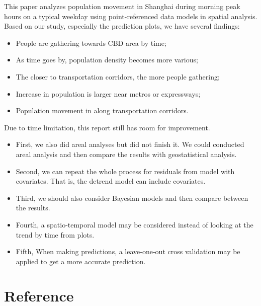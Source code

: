 \documentclass[hidelinks,12pt]{article}
\begin{document}
	This paper analyzes population movement in Shanghai during morning peak hours on a typical weekday using point-referenced data models in spatial analysis. Based on our study, especially the prediction plots, we have several findings:
	\begin{itemize}
		\item People are gathering towards CBD area by time;
		\item As time goes by, population density becomes more various;
		\item The closer to transportation corridors, the more people gathering;
		\item Increase in population is larger near metros or expressways;
		\item Population movement in along transportation corridors.
	\end{itemize}

	Due to time limitation, this report still has room for improvement.
	\begin{itemize}
		\item First, we also did areal analyses but did not finish it. We could conducted areal analysis and then compare the results with geostatistical analysis.
		\item Second, we can repeat the whole process for residuals from model with covariates. That is, the detrend model can include covariates.
		\item Third, we should also consider Bayesian models and then compare between the results.
		\item Fourth, a spatio-temporal model may be considered instead of looking at the trend by time from plots.
		\item Fifth, When making predictions, a leave-one-out cross validation may be applied to get a more accurate prediction.
	\end{itemize}
\cite{khan2013mobile}
	
	\section{Reference}\label{sec:ref}
	
	
	
	\clearpage
	\appendix
\end{document}
